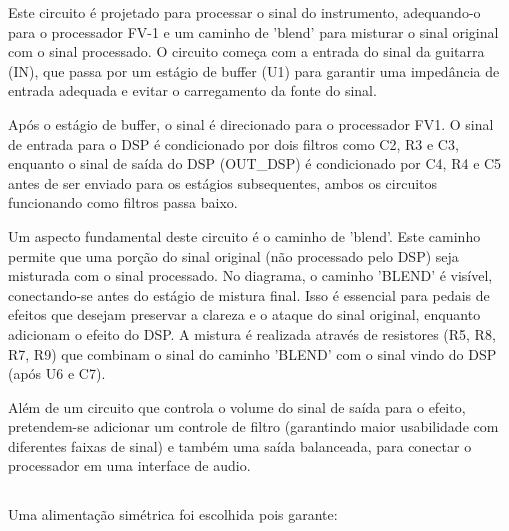 Este circuito é projetado para processar o sinal do instrumento, adequando-o para o processador FV-1 e um caminho de 'blend' para misturar o sinal original com o sinal processado. O circuito começa com a entrada do sinal da guitarra (IN), que passa por um estágio de buffer (U1) para garantir uma impedância de entrada adequada e evitar o carregamento da fonte do sinal. 

Após o estágio de buffer, o sinal é direcionado para o processador FV1. O sinal de entrada para o DSP é condicionado por dois filtros como C2, R3 e C3, enquanto o sinal de saída do DSP (OUT_DSP) é condicionado por C4, R4 e C5 antes de ser enviado para os estágios subsequentes, ambos os circuitos funcionando como filtros passa baixo.

Um aspecto fundamental deste circuito é o caminho de 'blend'. Este caminho permite que uma porção do sinal original (não processado pelo DSP) seja misturada com o sinal processado. No diagrama, o caminho 'BLEND' é visível, conectando-se antes do estágio de mistura final. Isso é essencial para pedais de efeitos que desejam preservar a clareza e o ataque do sinal original, enquanto adicionam o efeito do DSP. A mistura é realizada através de resistores (R5, R8, R7, R9) que combinam o sinal do caminho 'BLEND' com o sinal vindo do DSP (após U6 e C7).

Além de um circuito que controla o volume do sinal de saída para o efeito, pretendem-se adicionar um controle de filtro (garantindo maior usabilidade com diferentes faixas de sinal) e também uma saída balanceada, para conectar o processador em uma interface de audio.

\subsection{}
Uma alimentação simétrica foi escolhida pois garante:


